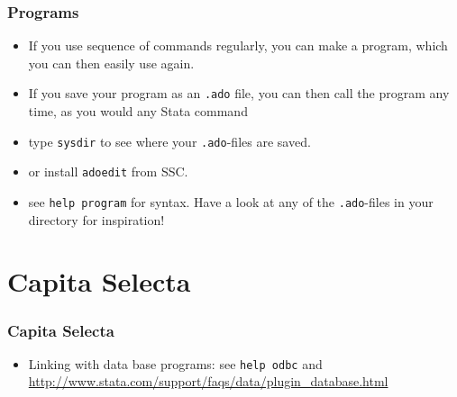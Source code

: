 \documentclass[pdftex, compress]{beamer}
\begin{document}
\begin{frame}
\frametitle{Programs}
	\begin{itemize}
		\item If you use sequence of commands regularly, you can make a program, which you can then easily use again.
		\item If you save your program as an \texttt{.ado} file, you can then call the program any time, as you would any Stata command
		\item type \texttt{sysdir} to see where your \texttt{.ado}-files are saved. 
		\item or install \texttt{adoedit} from SSC.
		\item see \texttt{help program} for syntax. Have a look at any of the \texttt{.ado}-files in your directory for inspiration!
	\end{itemize}
\end{frame}

\section{Capita Selecta}

\begin{frame}
\frametitle{Capita Selecta}
\begin{itemize}
	\item Linking with data base programs: see \texttt{help odbc} and \url{http://www.stata.com/support/faqs/data/plugin_database.html}
\end{itemize}
\end{frame}
\end{document}
